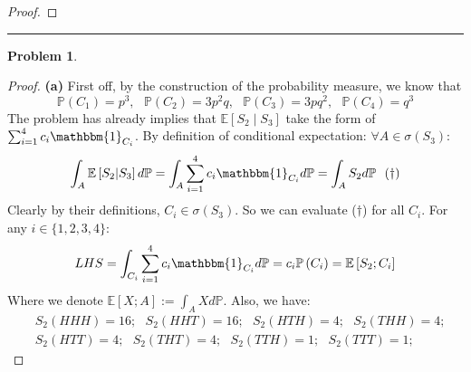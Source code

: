 \documentclass[a4paper, 10pt]{article}
\theoremstyle{definition}
\newtheorem{problem}{Problem}
\theoremstyle{hSol}
\begin{document}
\begin{proof}
\end{proof}

\noindent\rule{16cm}{0.4pt}
\begin{problem}
\end{problem}
\begin{proof} \textbf{(a)} First off, by the construction of the probability measure, we know that
\begin{equation}
	\mathbb{P}\left(C_1\right) = p^3,~~~\mathbb{P}\left(C_2\right) = 3p^2q,~~~\mathbb{P}\left(C_3\right) = 3pq^2,~~~\mathbb{P}\left(C_4\right) = q^3
\end{equation}
The problem has already implies that $\mathbb{E}\left[S_2\middle|S_3\right]$ take the form of $\sum_{i=1}^4 c_i \mathbbm{1}_{C_i}$. By definition of conditional expectation: $\forall A \in \sigma(S_3)$:
$$
\int_A \mathbb{E}\left[S_2\middle|S_3\right] d \mathbb{P} = \int_A \sum_{i=1}^4c_i \mathbbm{1}_{C_i} d \mathbb{P} = \int_A S_2 d \mathbb{P}~~(\dag)
$$
Clearly by their definitions, $C_i \in \sigma(S_3)$. So we can evaluate ($\dag$) for all $C_i$. For any $i\in\{1,2,3,4\}$:
\begin{equation}
	LHS = \int_{C_i}\sum_{i=1}^4c_i \mathbbm{1}_{C_i} d \mathbb{P} = c_i \mathbb{P}\left(C_i\right) = \mathbb{E}\left[S_2; C_i\right]
\end{equation}
Where we denote $\mathbb{E}\left[X; A\right]:=\int_A X d \mathbb{P}$. Also, we have:
\begin{equation}
	\begin{split}
	&S_2(HHH) = 16;~~~S_2(HHT) = 16;~~~S_2(HTH) = 4;~~~S_2(THH) =4;\\
	&S_2(HTT) = 4;~~~S_2(THT) = 4;~~~S_2(TTH) = 1;~~~S_2(TTT) =1;
\end{split}
\end{equation}


\end{proof}
\end{document}
